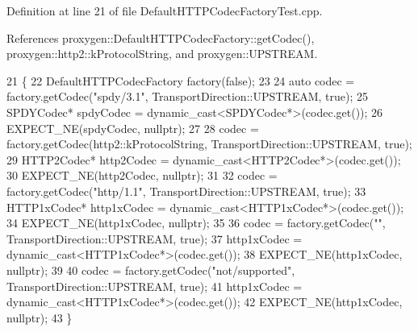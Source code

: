 Definition at line 21 of file Default\+H\+T\+T\+P\+Codec\+Factory\+Test.\+cpp.



References proxygen\+::\+Default\+H\+T\+T\+P\+Codec\+Factory\+::get\+Codec(), proxygen\+::http2\+::k\+Protocol\+String, and proxygen\+::\+U\+P\+S\+T\+R\+E\+AM.


\begin{DoxyCode}
21                                             \{
22   DefaultHTTPCodecFactory factory(\textcolor{keyword}{false});
23 
24   \textcolor{keyword}{auto} codec = factory.getCodec(\textcolor{stringliteral}{"spdy/3.1"}, TransportDirection::UPSTREAM, \textcolor{keyword}{true});
25   SPDYCodec* spdyCodec = \textcolor{keyword}{dynamic\_cast<}SPDYCodec*\textcolor{keyword}{>}(codec.get());
26   EXPECT\_NE(spdyCodec, \textcolor{keyword}{nullptr});
27 
28   codec = factory.getCodec(http2::kProtocolString, TransportDirection::UPSTREAM, \textcolor{keyword}{true});
29   HTTP2Codec* http2Codec = \textcolor{keyword}{dynamic\_cast<}HTTP2Codec*\textcolor{keyword}{>}(codec.get());
30   EXPECT\_NE(http2Codec, \textcolor{keyword}{nullptr});
31 
32   codec = factory.getCodec(\textcolor{stringliteral}{"http/1.1"}, TransportDirection::UPSTREAM, \textcolor{keyword}{true});
33   HTTP1xCodec* http1xCodec = \textcolor{keyword}{dynamic\_cast<}HTTP1xCodec*\textcolor{keyword}{>}(codec.get());
34   EXPECT\_NE(http1xCodec, \textcolor{keyword}{nullptr});
35 
36   codec = factory.getCodec(\textcolor{stringliteral}{""}, TransportDirection::UPSTREAM, \textcolor{keyword}{true});
37   http1xCodec = \textcolor{keyword}{dynamic\_cast<}HTTP1xCodec*\textcolor{keyword}{>}(codec.get());
38   EXPECT\_NE(http1xCodec, \textcolor{keyword}{nullptr});
39 
40   codec = factory.getCodec(\textcolor{stringliteral}{"not/supported"}, TransportDirection::UPSTREAM, \textcolor{keyword}{true});
41   http1xCodec = \textcolor{keyword}{dynamic\_cast<}HTTP1xCodec*\textcolor{keyword}{>}(codec.get());
42   EXPECT\_NE(http1xCodec, \textcolor{keyword}{nullptr});
43 \}
\end{DoxyCode}
